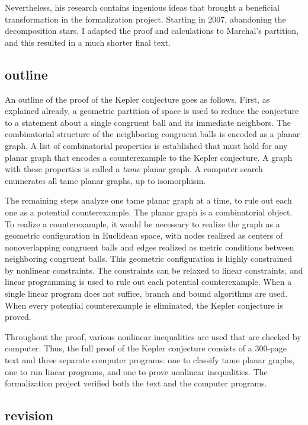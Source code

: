 \documentclass{amsart}
\begin{document}
Nevertheless, his research contains ingenious ideas that brought a
beneficial transformation in the formalization project.  Starting in
2007, abandoning the decomposition stars, I adapted the proof and
calculations to Marchal's partition, and this resulted in a much
shorter final text.

\subsection{outline}

An outline of the proof of the Kepler conjecture goes as follows.
First, as explained already, a geometric partition of space is used to
reduce the conjecture to a statement about a single congruent ball and
its immediate neighbors.  The combinatorial structure of the
neighboring congruent balls is encoded as a planar graph.  A list of
combinatorial properties is established that must hold for any planar
graph that encodes a counterexample to the Kepler conjecture.  A graph
with these properties is called a \emph{tame} planar graph.  A
computer search enumerates all tame planar graphs, up to isomorphism.

The remaining steps analyze one tame planar graph at a time, to rule
out each one as a potential counterexample.  The planar graph is a
combinatorial object.  To realize a counterexample, it would be
necessary to realize the graph as a geometric configuration in
Euclidean space, with nodes realized as centers of nonoverlapping
congruent balls and edges realized as metric conditions between
neighboring congruent balls.  This geometric configuration is highly
constrained by nonlinear constraints.  The constraints can be relaxed
to linear constraints, and linear programming is used to rule out each
potential counterexample.  When a single linear program does not
suffice, branch and bound algorithms are used.  When every potential
counterexample is eliminated, the Kepler conjecture is proved.

Throughout the proof, various nonlinear inequalities are used that are
checked by computer.  Thus, the full proof of the Kepler
conjecture consists of a 300-page text and three separate computer
programs: one to classify tame planar graphs, one to run linear
programs, and one to prove nonlinear inequalities.  The formalization
project verified both the text and the computer programs.

\subsection{revision}
\end{document}
